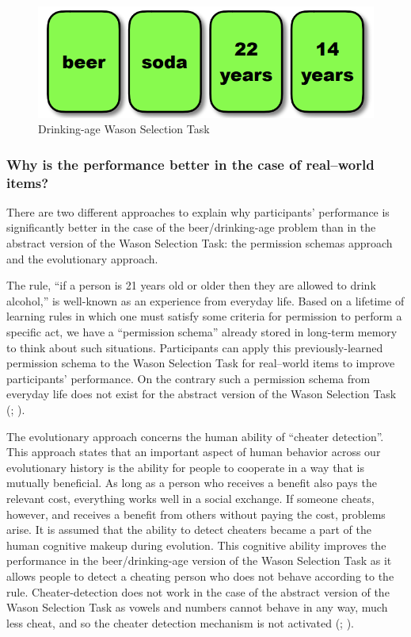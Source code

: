 \documentclass[
]{krantz}
\begin{document}
\begin{figure}

{\centering \includegraphics[width=0.6\linewidth]{images/ch9/fig3} 

}

\caption{Drinking-age Wason Selection Task}\label{fig:wason2}
\end{figure}

\subsubsection*{Why is the performance better in the case of real--world items?}\label{why-is-the-performance-better-in-the-case-of-realworld-items}


There are two different approaches to explain why participants' performance is significantly better in the case of the beer/drinking-age problem than in the abstract version of the Wason Selection Task: the permission schemas approach and the evolutionary approach.

The rule, ``if a person is 21 years old or older then they are allowed to drink alcohol,'' is well-known as an experience from everyday life. Based on a lifetime of learning rules in which one must satisfy some criteria for permission to perform a specific act, we have a ``permission schema'' already stored in long-term memory to think about such situations. Participants can apply this previously-learned permission schema to the Wason Selection Task for real--world items to improve participants' performance. On the contrary such a permission schema from everyday life does not exist for the abstract version of the Wason Selection Task (; ).

The evolutionary approach concerns the human ability of ``cheater detection''. This approach states that an important aspect of human behavior across our evolutionary history is the ability for people to cooperate in a way that is mutually beneficial. As long as a person who receives a benefit also pays the relevant cost, everything works well in a social exchange. If someone cheats, however, and receives a benefit from others without paying the cost, problems arise. It is assumed that the ability to detect cheaters became a part of the human cognitive makeup during evolution. This cognitive ability improves the performance in the beer/drinking-age version of the Wason Selection Task as it allows people to detect a cheating person who does not behave according to the rule. Cheater-detection does not work in the case of the abstract version of the Wason Selection Task as vowels and numbers cannot behave in any way, much less cheat, and so the cheater detection mechanism is not activated (; ).
\end{document}
